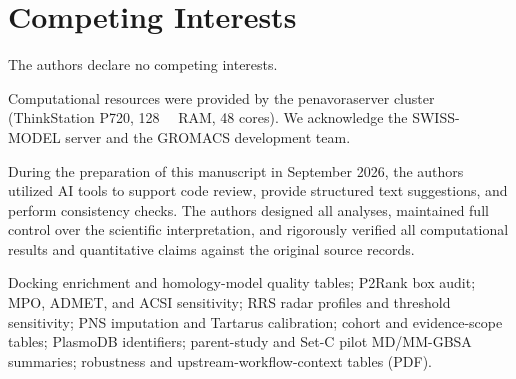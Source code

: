 \documentclass[journal=jcisd8,manuscript=article,layout=traditional]{achemso}
\begin{document}
\section*{Competing Interests}

The authors declare no competing interests.

\begin{acknowledgement}
Computational resources were provided by the penavoraserver cluster (ThinkStation P720, \qty{128}{\giga\byte} RAM, \num{48} cores). We acknowledge the SWISS-MODEL server and the GROMACS development team.

During the preparation of this manuscript in September 2026, the authors utilized AI tools to support code review, provide structured text suggestions, and perform consistency checks. The authors designed all analyses, maintained full control over the scientific interpretation, and rigorously verified all computational results and quantitative claims against the original source records.
\end{acknowledgement}


\begin{suppinfo}
Docking enrichment and homology-model quality tables; P2Rank box audit; MPO, ADMET, and ACSI sensitivity; RRS radar profiles and threshold sensitivity; PNS imputation and Tartarus calibration; cohort and evidence-scope tables; PlasmoDB identifiers; parent-study and Set-C pilot MD/MM-GBSA summaries; robustness and upstream-workflow-context tables (PDF).
\end{suppinfo}



\end{document}

